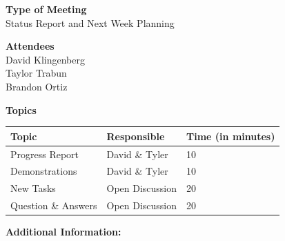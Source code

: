 \documentclass[pdftex,11pt]{article}
\begin{document}
{ \large \bfseries \hspace*{2 mm} Type of Meeting\\}
\hspace*{12 mm}  Status Report and  Next Week Planning
\vspace*{1.5mm}

{ \large \bfseries \hspace*{2 mm} Attendees\\}
\hspace*{12mm} David Klingenberg\\
\hspace*{12mm} Taylor Trabun\\
\hspace*{12mm} Brandon Ortiz\\
\vspace*{1.5mm}

{ \large \bfseries \noindent Topics}
\vspace*{2.5mm}

\begin{tabular}{| l | l | l |}
  \hline
  \bfseries Topic & \bfseries Responsible & \bfseries Time (in minutes) \\ \hline
  Progress Report  & David \& Tyler &  10 \\ \hline
  Demonstrations & David \& Tyler & 10 \\ \hline
  New Tasks & Open Discussion & 20 \\ \hline
  Question \&  Answers  & Open Discussion & 20 \\ 
  \hline
\end{tabular}

\vspace*{2.5mm}
{ \large \bfseries \noindent Additional Information:}
\end{document}
